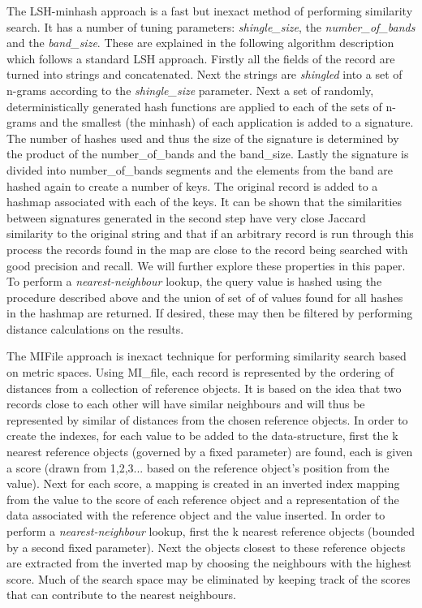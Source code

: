 \documentclass{llncs}
\begin{document}
The LSH-minhash approach is a fast but inexact method of performing similarity search. It has a number of tuning parameters: \textit{shingle\_size}, the \textit{number\_of\_bands} and the \textit{band\_size}. These are explained in the following algorithm description which follows a standard LSH approach. Firstly all the fields of the record are turned into strings and concatenated. Next the strings are \textit{shingled} into a set of n-grams according to the \textit{shingle\_size} parameter. Next a set of randomly, deterministically generated hash functions are applied to each of the sets of n-grams and the smallest (the minhash) of each application is added to a signature. The number of hashes used and thus the size of the signature is determined by the product of the {number\_of\_bands} and the {band\_size}.  Lastly the signature is divided into {number\_of\_bands} segments and the elements from the band are hashed again to create a number of keys. The original record is added to a hashmap associated with each of the keys. It can be shown that the similarities between signatures generated in the second step have very close Jaccard similarity to the original string and that if an arbitrary record is run through this process the records found in the map are close to the record being searched with good precision and recall. We will further explore these properties in this paper. To perform a {\textit{nearest-neighbour}} lookup, the query value is hashed using the procedure described above and the union of set of of values found for all hashes in the hashmap are returned. If desired, these may then be filtered by performing distance calculations on the results.

The MIFile \cite{amato2014mi} approach is inexact technique for performing similarity search based on metric spaces. Using  MI\_file,  each record is represented by the ordering of distances from a collection of reference objects. It is based on the idea that two records close to each other will have similar neighbours and will thus be represented by similar of distances from the chosen reference objects. 
In order to create the indexes, for each value to be added to the data-structure, first the k nearest reference objects (governed by a fixed parameter) are found, each is given a score (drawn from 1,2,3... based on the reference object's position from the value). Next for each score, a  mapping is created in an inverted index mapping from the value to the score of each reference object and a representation of the data associated with the reference object and the value inserted.  In order to perform a \textit{nearest-neighbour} lookup, first the k nearest reference objects (bounded by a second fixed parameter). Next the objects closest to these reference objects are extracted from the inverted map by choosing the neighbours with the highest score. Much of the search space may be eliminated by  keeping track of the scores that  can contribute to the nearest neighbours.
\end{document}

